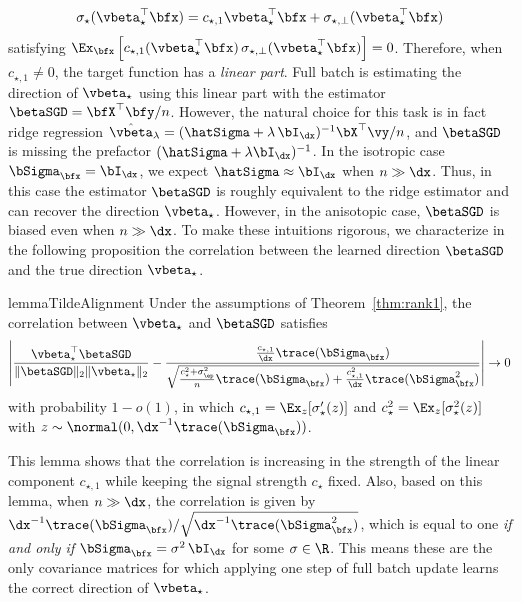 \begin{align*}
    \sigma_\star( \vbeta_\star^\top \bfx)  = c_{\star, 1}\vbeta_\star^\top \bfx + \sigma_{\star, \perp}(\vbeta_\star^\top \bfx)
\end{align*}
satisfying $\Ex_\bfx\left[ c_{\star, 1} (\vbeta_\star^\top \bfx)\, \sigma_{\star, \perp}(\vbeta_\star^\top \bfx)\right] = 0$. Therefore, when $c_{\star, 1} \neq 0$, the target function has a \textit{linear part}. Full batch \SGD is estimating the direction of $\vbeta_\star$ using this linear part with the estimator $\betaSGD = \bfX^\top\bfy/n$. However, the natural choice for this task is in fact ridge regression $\hat\vbeta_\lambda = (\hatSigma + \lambda \, \bI_{\dx})^{-1} \bX^\top \vy/n$, and $\betaSGD$ is missing the prefactor $(\hatSigma + \lambda \bI_{\dx})^{-1}$. In the isotropic case $\bSigma_{\bfx} = \bI_{\dx}$, we expect 
$\hatSigma \approx \bI_{\dx}$ 
when $n \gg \dx$. Thus, in this case the estimator $\betaSGD$ is roughly equivalent to the ridge estimator and can recover the direction $\vbeta_\star$. However, in the anisotopic case, $\betaSGD$ is biased even when $n \gg \dx$. To make these intuitions rigorous, we characterize in the following proposition the correlation between the learned direction $\betaSGD$ and the true direction $\vbeta_\star$.

\begin{restatable}{lemma}{TildeAlignment}
    \label{lemma:beta_tilde_alignment}
    Under the assumptions of Theorem~\ref{thm:rank1}, the correlation between $\vbeta_\star$ and $\betaSGD$ satisfies
    \begin{align*}
        \left|\frac{\vbeta_\star^\top \betaSGD}{\|\betaSGD\|_2  \|\vbeta_\star\|_2}  - \frac{\frac{c_{\star,1}}{\dx}\trace(\bSigma_\bfx) }{\sqrt{\frac{ c_{\star}^2 + \sigma_\ep^2}{n}\trace(\bSigma_\bfx) +\frac{c_{\star,1}^2}{\dx}    \trace(\bSigma_\bfx^2) }}\right| \to 0
    \end{align*}
    with probability $1 - o(1)$, in which $c_{\star, 1} = \Ex_{z} [\sigma_{\star}'(z)]$ and $c_{\star}^2 = \Ex_z[\sigma_{\star}^2(z)] $ with $z \sim \normal(0,\dx^{-1}\trace(\bSigma_\bfx))$.
\end{restatable}
This lemma shows that the correlation is increasing in the strength of the linear component $c_{\star, 1}$ while keeping the signal strength $c_{\star}$ fixed. Also, based on this lemma, when $n \gg \dx$, the correlation is given by ${\dx^{-1} \trace(\bSigma_\bfx)}/{\sqrt{\dx^{-1}\trace(\bSigma_{\bfx}^2)}}$, which is equal to one \emph{if and only if} $\bSigma_{\bfx} = \sigma^2\, \bI_{\dx}$ for some $\sigma \in \R$. This means these are the only covariance matrices for which applying one step of full batch \SGD  update learns the correct direction of $\vbeta_\star$. 

